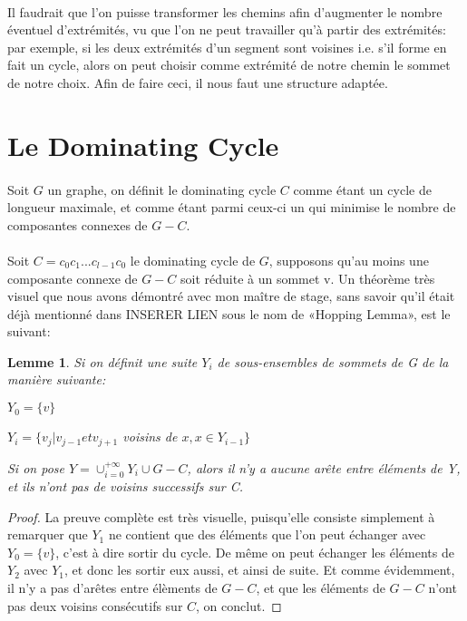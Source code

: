 \documentclass[a4paper]{article}
\newtheorem{lemma}[theorem]{Lemme}
\theoremstyle{definition}
\theoremstyle{remark}
\begin{document}
\paragraph{}
Il faudrait que l'on puisse transformer les chemins afin d'augmenter le
nombre éventuel d'extrémités, vu que l'on ne peut travailler qu'à partir
des extrémités: par exemple, si les deux extrémités d'un segment sont
voisines i.e. s'il forme en fait un cycle, alors on peut choisir comme
extrémité de notre chemin le sommet de notre choix. Afin de faire ceci,
il nous faut une structure adaptée.

\section{Le Dominating Cycle}

\paragraph{}
Soit $G$ un graphe, on définit le dominating cycle $C$ comme étant un 
cycle de longueur maximale, et comme étant parmi ceux-ci un qui minimise 
le nombre de composantes connexes de $G - C$.

\paragraph{}
Soit $C = c_{0} c_{1} ... c_{l-1} c_{0}$ le dominating cycle de $G$,
supposons qu'au moins une composante connexe de $G - C$ soit réduite à un
sommet v. Un théorème très visuel que nous avons démontré avec mon 
maître de stage, sans savoir qu'il était déjà mentionné dans INSERER 
LIEN sous le nom de «Hopping Lemma», est le suivant:

\begin{lemma}
Si on définit une suite $Y_{i}$ de sous-ensembles de sommets de G de la manière suivante:

$Y_{0}= \{v \}$

$Y_{i} = \{v_{j} | v_{j-1} et v_{j+1}$ voisins de $x, x \in Y_{i-1}\}$


Si on pose $Y = \cup_{i=0}^{+ \infty} Y_{i} \cup G-C$, alors il n'y a aucune arête entre éléments de Y, et ils n'ont pas de voisins successifs sur C.
\end{lemma}

\begin{proof}
La preuve complète est très visuelle, puisqu'elle consiste simplement à
remarquer que $Y_{1}$ ne contient que des éléments que l'on peut 
échanger avec $Y_{0} = \{v\}$, c'est à dire sortir du cycle. De même  on peut échanger les éléments de $Y_{2}$ avec $Y_{1}$, et donc les sortir 
eux aussi, et ainsi de suite. Et comme évidemment, il n'y a pas d'arêtes
entre élèments de $G-C$, et que les éléments de $G-C$ n'ont pas deux 
voisins consécutifs sur $C$, on conclut.
\end{proof}
\end{document}
